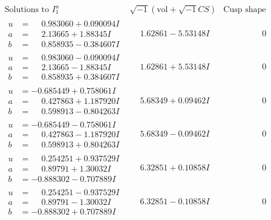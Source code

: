 \documentclass[1p]{elsarticle_modified}
\theoremstyle{definition}
\newcommand{\I}{\sqrt{-1}}
\begin{document}
$$\begin{array}{c|c|c}  
\text{Solutions to }I^u_{1}& \I (\text{vol} + \sqrt{-1}CS) & \text{Cusp shape}\\
 \hline 
\begin{aligned}
u &= \phantom{-}0.983060 + 0.090094 I \\
a &= \phantom{-}2.13665 + 1.88345 I \\
b &= \phantom{-}0.858935 - 0.384607 I\end{aligned}
 & \phantom{-}1.62861 - 5.53148 I & \phantom{-0.000000 } 0 \\ \hline\begin{aligned}
u &= \phantom{-}0.983060 - 0.090094 I \\
a &= \phantom{-}2.13665 - 1.88345 I \\
b &= \phantom{-}0.858935 + 0.384607 I\end{aligned}
 & \phantom{-}1.62861 + 5.53148 I & \phantom{-0.000000 } 0 \\ \hline\begin{aligned}
u &= -0.685449 + 0.758061 I \\
a &= \phantom{-}0.427863 + 1.187920 I \\
b &= \phantom{-}0.598913 - 0.804263 I\end{aligned}
 & \phantom{-}5.68349 + 0.09462 I & \phantom{-0.000000 } 0 \\ \hline\begin{aligned}
u &= -0.685449 - 0.758061 I \\
a &= \phantom{-}0.427863 - 1.187920 I \\
b &= \phantom{-}0.598913 + 0.804263 I\end{aligned}
 & \phantom{-}5.68349 - 0.09462 I & \phantom{-0.000000 } 0 \\ \hline\begin{aligned}
u &= \phantom{-}0.254251 + 0.937529 I \\
a &= \phantom{-}0.89791 + 1.30032 I \\
b &= -0.888302 - 0.707889 I\end{aligned}
 & \phantom{-}6.32851 + 0.10858 I & \phantom{-0.000000 } 0 \\ \hline\begin{aligned}
u &= \phantom{-}0.254251 - 0.937529 I \\
a &= \phantom{-}0.89791 - 1.30032 I \\
b &= -0.888302 + 0.707889 I\end{aligned}
 & \phantom{-}6.32851 - 0.10858 I & \phantom{-0.000000 } 0 \\ \hline\begin{aligned}

\end{aligned}
\end{array}$$
\end{document}
